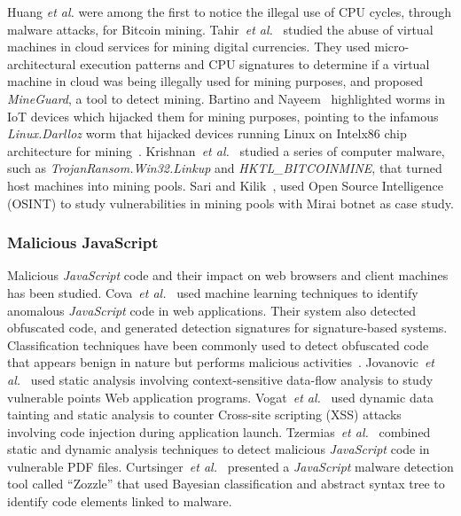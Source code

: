 \documentclass[acmlarge]{acmart}
\newcommand{\js}{{\em JavaScript}\xspace}
\newcommand{\etal}{{\em et al.}\xspace}
\begin{document}
Huang \etal \cite{HuangDMDGMSWSL14}  were among the first to notice the illegal use of CPU cycles, through malware attacks, for Bitcoin mining. Tahir~\etal~\cite{TahirHDAGZCB17} studied the abuse of virtual machines in cloud services for mining digital currencies. They used micro-architectural execution patterns and CPU signatures to determine if a virtual machine in cloud was being illegally used for mining purposes, and proposed \textit{MineGuard}, a tool to detect mining. Bartino and Nayeem~\cite{BertinoN-17} highlighted worms in IoT devices which hijacked them for mining purposes, pointing to the infamous {\em Linux.Darlloz} worm that hijacked devices running Linux on Intelx86 chip architecture for mining~\cite{Bansal-14}. Krishnan~\etal~\cite{KrishnanSV-17} studied a series of computer malware, such as {\em TrojanRansom.Win32.Linkup} and {\em HKTL\_BITCOINMINE}, that turned host machines into mining pools. Sari and Kilik~\cite{SariS-17}, used Open Source Intelligence (OSINT) to study vulnerabilities in mining pools with Mirai botnet as case study. 


\subsubsection*{Malicious JavaScript} Malicious \js code and their impact on web browsers and client machines has been studied. Cova~\etal~\cite{CovaKV10} used machine learning techniques to identify anomalous \js code in web applications. Their system also detected obfuscated code, and generated detection signatures for signature-based systems. Classification techniques have been commonly used to detect obfuscated code that appears benign in nature but performs malicious activities~\cite{LikarishJJ09,hou2010malicious,kejriwal2014method}. Jovanovic~\etal~\cite{JovanovicKK06} used static analysis involving context-sensitive data-flow analysis to study vulnerable points Web application programs. Vogat~\etal~\cite{VogtNJKKV07} used dynamic data tainting and static analysis to counter Cross-site scripting (XSS) attacks involving code injection during application launch. Tzermias~\etal~\cite{TzermiasSPM11} combined static and dynamic analysis techniques to detect malicious \js code in vulnerable PDF files. Curtsinger~\etal~\cite{CurtsingerLZS11} presented a \js malware detection tool called ``Zozzle'' that used Bayesian classification and abstract syntax tree
to identify code elements linked to malware. 
\end{document}

